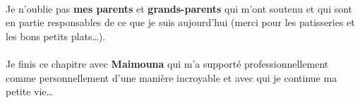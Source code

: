 \paragraph{} %
Je n’oublie pas \textbf{mes parents} et \textbf{grands-parents} qui m’ont soutenu
et qui sont en partie responsables de ce que je suis aujourd’hui (merci pour les patisseries
et les bons petits plats\dots).

\paragraph{} %
Je finis ce chapitre avec \textbf{Maimouna} qui m’a supporté professionnellement
comme personnellement d’une manière incroyable et avec qui je continue ma petite vie\dots

